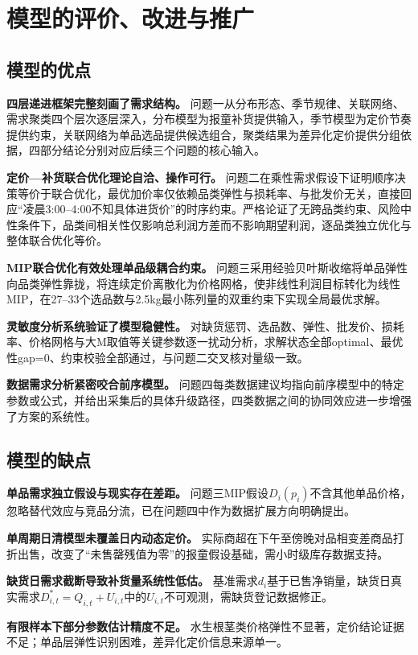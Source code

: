 \section{模型的评价、改进与推广}

\subsection{模型的优点}
\textbf{四层递进框架完整刻画了需求结构。} 问题一从分布形态、季节规律、关联网络、需求聚类四个层次逐层深入，分布模型为报童补货提供输入，季节模型为定价节奏提供约束，关联网络为单品选品提供候选组合，聚类结果为差异化定价提供分组依据，四部分结论分别对应后续三个问题的核心输入。

\textbf{定价—补货联合优化理论自洽、操作可行。} 问题二在乘性需求假设下证明顺序决策等价于联合优化，最优加价率仅依赖品类弹性与损耗率、与批发价无关，直接回应“凌晨3:00--4:00不知具体进货价”的时序约束。严格论证了无跨品类约束、风险中性条件下，品类间相关性仅影响总利润方差而不影响期望利润，逐品类独立优化与整体联合优化等价。

\textbf{MIP联合优化有效处理单品级耦合约束。} 问题三采用经验贝叶斯收缩将单品弹性向品类弹性靠拢，将连续定价离散化为价格网格，使非线性利润目标转化为线性MIP，在27--33个选品数与2.5kg最小陈列量的双重约束下实现全局最优求解。

\textbf{灵敏度分析系统验证了模型稳健性。} 对缺货惩罚、选品数、弹性、批发价、损耗率、价格网格与大M取值等关键参数逐一扰动分析，求解状态全部optimal、最优性gap=0、约束校验全部通过，与问题二交叉核对量级一致。

\textbf{数据需求分析紧密咬合前序模型。} 问题四每类数据建议均指向前序模型中的特定参数或公式，并给出采集后的具体升级路径，四类数据之间的协同效应进一步增强了方案的系统性。

\subsection{模型的缺点}
\textbf{单品需求独立假设与现实存在差距。} 问题三MIP假设$D_i(p_i)$不含其他单品价格，忽略替代效应与竞品分流，已在问题四中作为数据扩展方向明确提出。

\textbf{单周期日清模型未覆盖日内动态定价。} 实际商超在下午至傍晚对品相变差商品打折出售，改变了“未售罄残值为零”的报童假设基础，需小时级库存数据支持。

\textbf{缺货日需求截断导致补货量系统性低估。} 基准需求$d_i$基于已售净销量，缺货日真实需求$D_{i,t}^*=Q_{i,t}+U_{i,t}$中的$U_{i,t}$不可观测，需缺货登记数据修正。

\textbf{有限样本下部分参数估计精度不足。} 水生根茎类价格弹性不显著，定价结论证据不足；单品层弹性识别困难，差异化定价信息来源单一。

